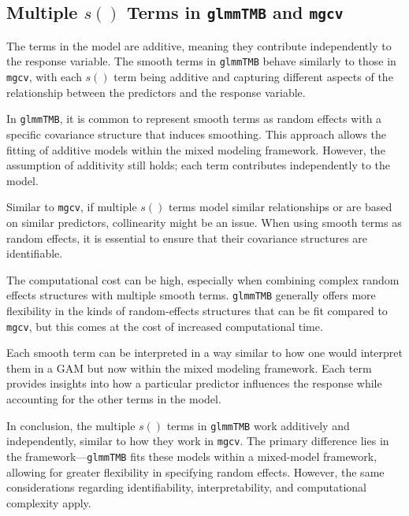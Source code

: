 \subsection{Multiple \( s() \) Terms in \texttt{glmmTMB} and \texttt{mgcv}}

The terms in the model are additive, meaning they contribute independently to the response variable. The smooth terms in \texttt{glmmTMB} behave similarly to those in \texttt{mgcv}, with each \( s() \) term being additive and capturing different aspects of the relationship between the predictors and the response variable.


In \texttt{glmmTMB}, it is common to represent smooth terms as random effects with a specific covariance structure that induces smoothing. This approach allows the fitting of additive models within the mixed modeling framework. However, the assumption of additivity still holds; each term contributes independently to the model.


Similar to \texttt{mgcv}, if multiple \( s() \) terms model similar relationships or are based on similar predictors, collinearity might be an issue. When using smooth terms as random effects, it is essential to ensure that their covariance structures are identifiable.


The computational cost can be high, especially when combining complex random effects structures with multiple smooth terms. \texttt{glmmTMB} generally offers more flexibility in the kinds of random-effects structures that can be fit compared to \texttt{mgcv}, but this comes at the cost of increased computational time.


Each smooth term can be interpreted in a way similar to how one would interpret them in a GAM but now within the mixed modeling framework. Each term provides insights into how a particular predictor influences the response while accounting for the other terms in the model.


In conclusion, the multiple \( s() \) terms in \texttt{glmmTMB} work additively and independently, similar to how they work in \texttt{mgcv}. The primary difference lies in the framework—\texttt{glmmTMB} fits these models within a mixed-model framework, allowing for greater flexibility in specifying random effects. However, the same considerations regarding identifiability, interpretability, and computational complexity apply.













